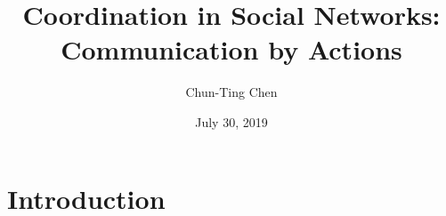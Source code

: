 \documentclass[12pt,letter]{article}
\theoremstyle{definition}
\theoremstyle{remark}
\theoremstyle{claim}
\begin{document}

\title {Coordination in Social Networks: Communication by Actions}
\author {Chun-Ting Chen}
\date{July 30, 2019}
\maketitle

\begin{abstract}





\end{abstract}


\section{Introduction} 
\end{document}
